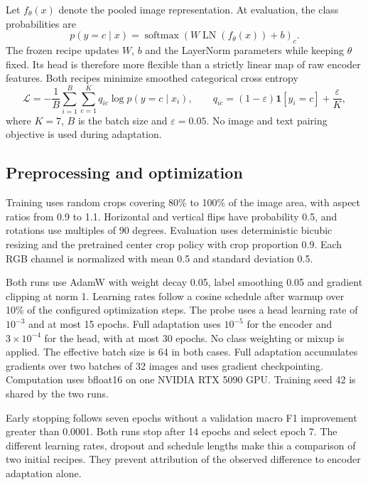\documentclass[10pt,a4paper]{article}
\begin{document}
Let $f_\theta(x)$ denote the pooled image representation.
At evaluation, the class probabilities are
\begin{equation}
  p(y=c\mid x)=\operatorname{softmax}\!\left(W\operatorname{LN}(f_\theta(x))+b\right)_c.
\end{equation}
The frozen recipe updates $W$, $b$ and the LayerNorm parameters while keeping
$\theta$ fixed. Its head is therefore more flexible than a strictly linear
map of raw encoder features. Both recipes minimize smoothed categorical
cross entropy
\begin{equation}
  \mathcal{L}=-\frac{1}{B}\sum_{i=1}^{B}\sum_{c=1}^{K}q_{ic}\log p(y=c\mid x_i),
  \qquad q_{ic}=(1-\varepsilon)\mathbf{1}[y_i=c]+\frac{\varepsilon}{K},
\end{equation}
where $K=7$, $B$ is the batch size and $\varepsilon=0.05$. No image and text
pairing objective is used during adaptation.

\subsection{Preprocessing and optimization}

Training uses random crops covering 80\% to 100\% of the image area, with
aspect ratios from 0.9 to 1.1. Horizontal and vertical flips have probability
0.5, and rotations use multiples of 90 degrees. Evaluation uses deterministic
bicubic resizing and the pretrained center crop policy with crop proportion
0.9. Each RGB channel is normalized with mean 0.5 and standard deviation 0.5.

Both runs use AdamW with weight decay 0.05, label smoothing 0.05 and gradient
clipping at norm 1. Learning rates follow a cosine schedule after warmup over
10\% of the configured optimization steps. The probe uses a head learning
rate of $10^{-3}$ and at most 15 epochs. Full adaptation uses $10^{-5}$ for
the encoder and $3\times10^{-4}$ for the head, with at most 30 epochs.
No class weighting or mixup is applied. The effective batch size is 64 in
both cases. Full adaptation accumulates gradients over two batches of 32
images and uses gradient checkpointing. Computation uses bfloat16 on one
NVIDIA RTX 5090 GPU. Training seed 42 is shared by the two runs.

Early stopping follows seven epochs without a validation macro F1 improvement
greater than 0.0001. Both runs stop after 14 epochs and select epoch 7. The
different learning rates, dropout and schedule lengths make this a comparison
of two initial recipes. They prevent attribution of the observed difference
to encoder adaptation alone.
\end{document}
